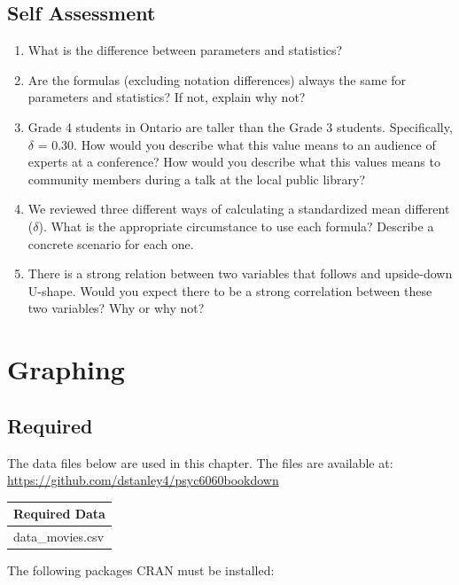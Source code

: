 \documentclass[
]{krantz}
\begin{document}
\hypertarget{self-assessment}{%
\section{Self Assessment}\label{self-assessment}}

\begin{enumerate}
\def\labelenumi{\arabic{enumi}.}
\item
  What is the difference between parameters and statistics?
\item
  Are the formulas (excluding notation differences) always the same for parameters and statistics? If not, explain why not?
\item
  Grade 4 students in Ontario are taller than the Grade 3 students. Specifically, \(\delta\) = 0.30. How would you describe what this value means to an audience of experts at a conference? How would you describe what this values means to community members during a talk at the local public library?
\item
  We reviewed three different ways of calculating a standardized mean different (\(\delta\)). What is the appropriate circumstance to use each formula? Describe a concrete scenario for each one.
\item
  There is a strong relation between two variables that follows and upside-down U-shape. Would you expect there to be a strong correlation between these two variables? Why or why not?
\end{enumerate}

\hypertarget{graphing}{%
\chapter{Graphing}\label{graphing}}

\hypertarget{required}{%
\section{Required}\label{required}}

The data files below are used in this chapter. The files are available at: \url{https://github.com/dstanley4/psyc6060bookdown}

\begin{longtable}[]{@{}l@{}}
\toprule
Required Data\tabularnewline
\midrule
\endhead
data\_movies.csv\tabularnewline
\bottomrule
\end{longtable}

The following packages CRAN must be installed:
\end{document}
